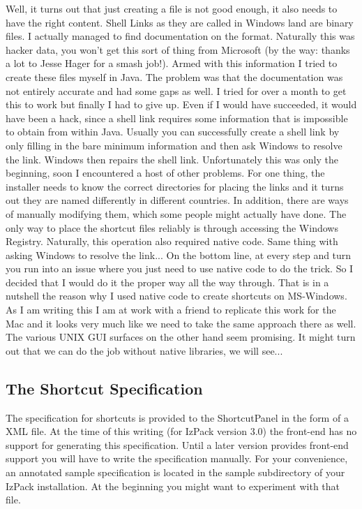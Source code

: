Well, it turns out that just creating a file is not good enough, it also
needs to have the right content. Shell Links as they are called in
Windows land are binary files. I actually managed to find documentation
on the format. Naturally this was hacker data, you won't get this sort
of thing from Microsoft (by the way: thanks a lot to Jesse Hager for a
smash job!). Armed with this information I tried to create these files
myself in Java. The problem was that the documentation was not entirely
accurate and had some gaps as well. I tried for over a month to get this
to work but finally I had to give up. Even if I would have succeeded, it
would have been a hack, since a shell link requires some information that
is impossible to obtain from within Java. Usually you can successfully
create a shell link by only filling in the bare minimum information and
then ask Windows to resolve the link. Windows then repairs the shell
link. Unfortunately this was only the beginning, soon I encountered a
host of other problems. For one thing, the installer needs to know the
correct directories for placing the links and it turns out they are
named differently in different countries. In addition, there are ways of
manually modifying them, which some people might actually have done. The
only way to place the shortcut files reliably is through accessing the
Windows Registry. Naturally, this operation also required native code.
Same thing with asking Windows to resolve the link... On the bottom
line, at every step and turn you run into an issue where you just need
to use native code to do the trick. So I decided that I would do it the
proper way all the way through. That is in a nutshell the reason why I
used native code to create shortcuts on MS-Windows.\\

As I am writing this I am at work with a friend to replicate this work
for the Mac and it looks very much like we need to take the same
approach there as well. The various UNIX GUI surfaces on the other hand
seem promising. It might turn out that we can do the job without native
libraries, we will see...\\

\subsection{The Shortcut Specification}

The specification for shortcuts is provided to the ShortcutPanel in the
form of a XML file. At the time of this writing (for IzPack version 3.0)
the front-end has no support for generating this specification. Until a
later version provides front-end support you will have to write the
specification manually. For your convenience, an annotated sample
specification is located in the sample subdirectory of your IzPack
installation. At the beginning you might want to experiment with that
file.\\

